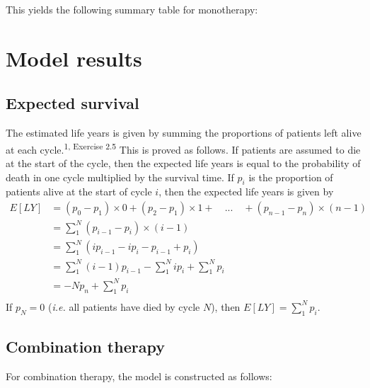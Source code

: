 \documentclass[
]{article}
\begin{document}
This yields the following summary table for monotherapy:

\hypertarget{model-results}{%
\section{Model results}\label{model-results}}

\hypertarget{expected-survival}{%
\subsection{Expected survival}\label{expected-survival}}

The estimated life years is given by summing the proportions of patients
left alive at each cycle.\textsuperscript{1, Exercise 2.5} This is
proved as follows. If patients are assumed to die at the start of the
cycle, then the expected life years is equal to the probability of death
in one cycle multiplied by the survival time. If \(p_i\) is the
proportion of patients alive at the start of cycle \(i\), then the
expected life years is given by \[
\begin{aligned}
E[LY] &= (p_0 - p_1) \times 0 + (p_2 - p_1) \times 1 + \quad ... \quad + (p_{n-1}-p_n)\times (n-1)\\
&= \sum_1^N (p_{i-1} -p_i)\times (i-1)\\
&= \sum_1^N (ip_{i-1}-ip_i -p_{i-1} + p_i)\\
&= \sum_1^N (i-1)p_{i-1} - \sum_1^N i p_i + \sum_1^N p_i\\
&= -Np_n + \sum_1^N p_i\\
\end{aligned}
\] If \(p_N = 0\) (\emph{i.e.} all patients have died by cycle \(N\)),
then \(E[LY] = \sum_1^N p_i\).

\hypertarget{combination-therapy}{%
\subsection{Combination therapy}\label{combination-therapy}}

For combination therapy, the model is constructed as follows:
\end{document}
